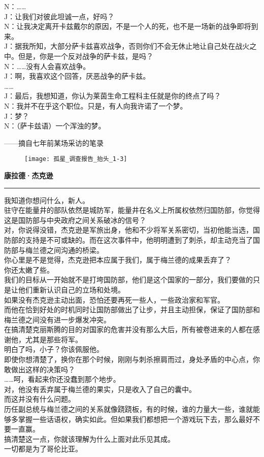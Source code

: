 \documentclass[openany]{book}
\begin{document}
N：……\\
J：让我们对彼此坦诚一点，好吗？\\
N：让我决定离开卡兹戴尔的原因，不是一个人的死，也不是一场新的战争即将到来。\\
J：据我所知，大部分萨卡兹喜欢战争，否则你们不会无休止地让自己处在战火之中。但是，你是一个反对战争的萨卡兹，是吗？\\
N：……没有人会喜欢战争。\\
J：啊，我喜欢这个回答，厌恶战争的萨卡兹。\\
……\\
J：最后，我想知道，你认为莱茵生命工程科主任就是你的终点了吗？\\
N：我并不在乎这个职位。只是，有人向我许诺了一个梦。\\
J：梦？\\
N：（萨卡兹语）一个浑浊的梦。\\
\begin{flushright}——摘自七年前某场采访的笔录\end{flushright}
\clearpage

\begin{figure}[h]
    \centering
    \texttt{[image: 孤星\_调查报告\_抬头\_1-3]}
\end{figure}
{\Large\textbf{康拉德·杰克逊}}\par\noindent\rule{\textwidth}{0.4pt}
我知道你想问什么，新人。\\
驻守在能量井的部队依然是城防军，能量井在名义上所属权依然归国防部，你觉得这是国防部与中央政府之间关系破冰的信号？\\
对，你说得没错，杰克逊是军旅出身，他和不少将军关系密切，当初他能当选，国防部的支持是不可或缺的。而在这次事件中，他明明遭到了刺杀，却主动充当了国防部与梅兰德之间沟通的桥梁。\\
你心里是不是觉得，杰克逊把本应属于我们，属于梅兰德的成果丢弃了？\\
你还太嫩了些。\\
我们的目标从一开始就不是打垮国防部，他们是这个国家的一部分，我们要做的只是让他们重新认识自己的立场和处境。\\
如果没有杰克逊主动出面，恐怕还要再死一些人，一些政治家和军官。\\
而他在恰到好处的时机同时让国防部做出了让步，并且主动担保，保证了国防部和梅兰德之间没有进一步爆发冲突。\\
在搞清楚克丽斯腾的目的对国家的危害并没有那么大后，所有被卷进来的人都在感谢他，尤其是那些将军。\\
明白了吗，小子？你该佩服他。\\
即使你想清楚了，换你在那个时候，刚刚与刺杀擦肩而过，身处矛盾的中心点，你敢做出这样的决策吗？\\
……呵，看起来你还没蠢到那个地步。\\
对，他没有丢弃属于梅兰德的果实，只是收入了自己的囊中。\\
而这并没有什么问题。\\
历任副总统与梅兰德之间的关系就像跷跷板，有的时候，谁的力量大一些，谁就能够多掌握一些话语权，确实如此。但如果我们都想把一个游戏玩下去，那么最好不要一直赢。\\
搞清楚这一点，你就该理解为什么上面对此乐见其成。\\
一切都是为了哥伦比亚。
\clearpage
\end{document}
